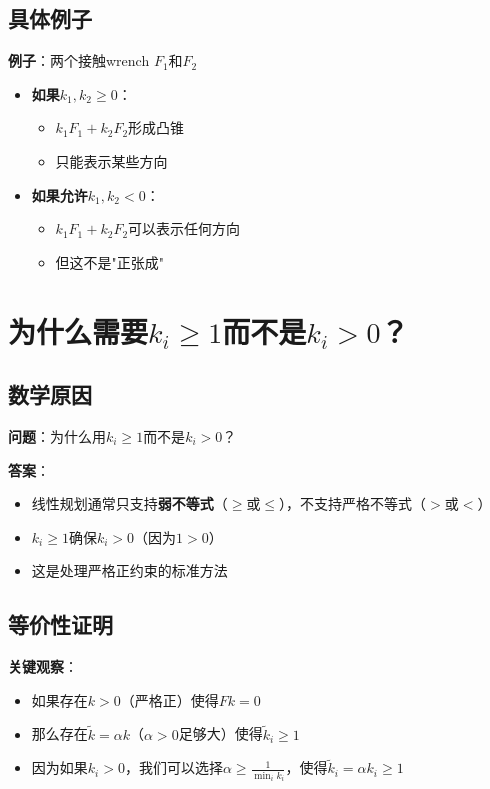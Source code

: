 \documentclass[12pt,a4paper]{article}
\begin{document}
\subsection{具体例子}

\textbf{例子}：两个接触wrench $F_1$和$F_2$

\begin{itemize}
\item \textbf{如果$k_1, k_2 \geq 0$}：
   \begin{itemize}
   \item $k_1 F_1 + k_2 F_2$形成凸锥
   \item 只能表示某些方向
   \end{itemize}

\item \textbf{如果允许$k_1, k_2 < 0$}：
   \begin{itemize}
   \item $k_1 F_1 + k_2 F_2$可以表示任何方向
   \item 但这不是"正张成"
   \end{itemize}
\end{itemize}

\section{为什么需要$k_i \geq 1$而不是$k_i > 0$？}

\subsection{数学原因}

\textbf{问题}：为什么用$k_i \geq 1$而不是$k_i > 0$？

\textbf{答案}：
\begin{itemize}
\item 线性规划通常只支持\textbf{弱不等式}（$\geq$或$\leq$），不支持严格不等式（$>$或$<$）
\item $k_i \geq 1$确保$k_i > 0$（因为$1 > 0$）
\item 这是处理严格正约束的标准方法
\end{itemize}

\subsection{等价性证明}

\textbf{关键观察}：
\begin{itemize}
\item 如果存在$k > 0$（严格正）使得$F k = 0$
\item 那么存在$\tilde{k} = \alpha k$（$\alpha > 0$足够大）使得$\tilde{k}_i \geq 1$
\item 因为如果$k_i > 0$，我们可以选择$\alpha \geq \frac{1}{\min_i k_i}$，使得$\tilde{k}_i = \alpha k_i \geq 1$
\end{itemize}
\end{document}
